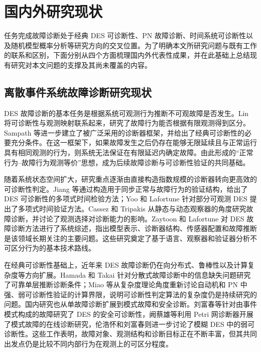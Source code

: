 \documentclass[master,fontset=ubuntu]{shnuthesis}
\theoremstyle{definition}
\begin{document}
\section{国内外研究现状}

任务完成故障诊断处于经典 DES 可诊断性、PN 故障诊断、时间系统可诊断性以及随机模型概率分析等研究方向的交叉位置。为了明确本文所研究问题与既有工作的联系和区别，下面分别从四个方面梳理国内外代表性成果，并在此基础上总结现有研究对本文问题的支撑及其尚未覆盖的内容。

\subsection{离散事件系统故障诊断研究现状}

DES 故障诊断的基本任务是根据系统可观测行为推断不可观故障是否发生。Lin 将可诊断性与观测映射联系起来，研究了故障行为能否根据有限观测得到区分\cite{Lin1994}。Sampath 等进一步建立了被广泛采用的诊断器框架，并给出了经典可诊断性的必要充分条件\cite{Sampath1995}。在这一框架下，如果故障发生之后仍存在能够无限延续且与正常运行具有相同观测的行为，则系统无法保证在有限延迟内确定故障。由此形成的“正常行为--故障行为观测等价”思想，成为后续故障诊断与可诊断性验证的共同基础。

随着系统状态空间扩大，研究重点逐渐由直接构造指数规模的诊断器转向更高效的可诊断性判定。Jiang 等通过构造用于同步正常与故障行为的验证结构，给出了 DES 可诊断性的多项式时间检验方法\cite{Jiang2001}；Yoo 和 Lafortune 针对部分可观测 DES 提出了多项式时间验证方法\cite{Yoo2002}。Cassez 和 Tripakis 从静态与动态观察器的角度研究故障诊断，并讨论了观测选择对诊断能力的影响\cite{Cassez2008}。Zaytoon 和 Lafortune 对 DES 故障诊断方法进行了系统综述，指出模型表示、诊断器结构、传感器配置和故障推断是该领域长期关注的主要问题\cite{Zaytoon2013}。这些研究奠定了基于语言、观察器和验证器分析不可区分行为的基本技术路线。

在经典可诊断性基础上，近年来 DES 故障诊断仍在向分布式、鲁棒性以及计算复杂度等方向扩展。Hamada 和 Takai 针对分散式故障诊断中的信息缺失问题研究了可靠单层推断诊断条件\cite{Hamada2024}；Miao 等从复杂度理论角度重新讨论自动机和 PN 中强、弱可诊断性验证的计算界限，说明可诊断性判定算法的复杂度仍是持续研究的问题\cite{Miao2026}。国内研究也从单故障诊断扩展到模式故障和安全诊断。刘富春等针对由事件模式构成的故障研究了 DES 的安全可诊断性\cite{LiuTang2020}，阙蔡雄等利用 Petri 网诊断器开展了模式故障的在线诊断研究\cite{Que2020}，伦浩怀和刘富春则进一步讨论了模糊 DES 中的弱可诊断性\cite{Lun2023}。这些工作表明，故障对象、观测结构和诊断目标正在不断丰富，但其共同出发点仍是比较不同内部行为在观测上的可区分程度。
\end{document}
